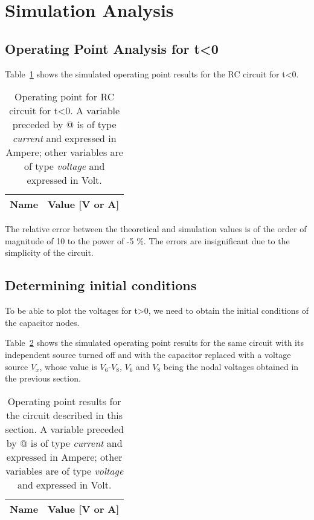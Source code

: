 \pagebreak
\section{Simulation Analysis}
\label{sec:simulation}

\subsection{Operating Point Analysis for t<0}

Table~\ref{tab:passo1} shows the simulated operating point results for the RC circuit
for t<0. 

\begin{table}[h]
  \centering
  \begin{tabular}{|l|r|}
    \hline    
    {\bf Name} & {\bf Value [V or A]} \\ \hline
    
  \end{tabular}
  \caption{Operating point for RC circuit for t<0. A variable preceded by @ is of type {\em current}
    and expressed in Ampere; other variables are of type {\it voltage} and expressed in
    Volt.}
  \label{tab:passo1}
\end{table}

The relative error between the theoretical and simulation values is of the order of magnitude of 10 to the power of -5 \%. The errors are insignificant due to the simplicity of the circuit.

\subsection{Determining initial conditions}

To be able to plot the voltages for t>0, we need to obtain the initial conditions of the capacitor nodes.

Table~\ref{tab:passo2} shows the simulated operating point results for the same circuit with its independent source turned off and with the capacitor replaced with a voltage source $V_x$, whose value is $V_6$-$V_8$, $V_6$ and $V_8$ being the nodal voltages obtained in the previous section. 

\begin{table}[h]
  \centering
  \begin{tabular}{|l|r|}
    \hline    
    {\bf Name} & {\bf Value [V or A]} \\ \hline
    
  \end{tabular}
  \caption{Operating point results for the circuit described in this section. A variable preceded by @ is of type {\em current}
    and expressed in Ampere; other variables are of type {\it voltage} and expressed in
    Volt.}
  \label{tab:passo2}
\end{table}

